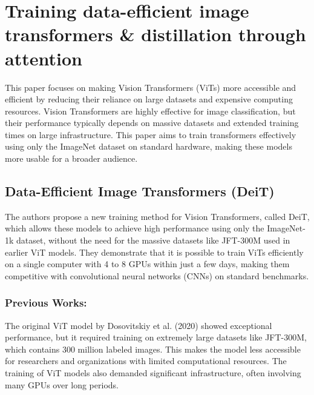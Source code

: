 \documentclass{report}
\begin{document}
	
	
	
	
	
	
	
	
	
	
	
	
	
	
	
	
	
	
	
	
	
	
	\chapter{Training data-efficient image transformers \& distillation through attention \cite{DBLP:journals/corr/abs-2012-12877}}
	
	This paper focuses on making Vision Transformers (ViTs) more accessible and efficient by reducing their reliance on large datasets and expensive computing resources. Vision Transformers are highly effective for image classification, but their performance typically depends on massive datasets and extended training times on large infrastructure. This paper aims to train transformers effectively using only the ImageNet dataset on standard hardware, making these models more usable for a broader audience.
	
	
	
	\section{Data-Efficient Image Transformers (DeiT)}
	The authors propose a new training method for Vision Transformers, called DeiT, which allows these models to achieve high performance using only the ImageNet-1k dataset, without the need for the massive datasets like JFT-300M used in earlier ViT models. They demonstrate that it is possible to train ViTs efficiently on a single computer with 4 to 8 GPUs within just a few days, making them competitive with convolutional neural networks (CNNs) on standard benchmarks.
	
	\subsection{Previous Works:}
	The original ViT model by Dosovitskiy et al. (2020) showed exceptional performance, but it required training on extremely large datasets like JFT-300M, which contains 300 million labeled images. This makes the model less accessible for researchers and organizations with limited computational resources. The training of ViT models also demanded significant infrastructure, often involving many GPUs over long periods.
	
\end{document}
